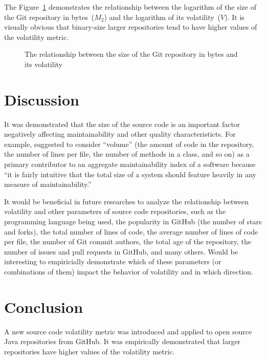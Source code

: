 \documentclass[sigconf]{acmart}
\begin{document}
The Figure~\ref{fig:2} demonstrates the relationship between
the logarithm of the size of the Git repository in bytes~($M_2$) and
the logarithm of its volatility~($V$).
It is visually obvious that
binary-size larger repositories tend to have higher values
of the volatility metric.

\begin{figure}[h]
  
  \caption{The relationship between the size of the Git repository in bytes and its volatility}
  \label{fig:2}
\end{figure}

\section{Discussion}
\label{sec:discussion}

It was demonstrated that the size of the source code is an important
factor negatively affecting maintainability and other quality characteristicts.
For example, \citet{heitlager2007} suggested to consider ``volume'' (the amount of code
in the repository, the number of lines per file, the number of methods in a class,
and so on) as a primary contributor to an aggregate maintainability index
of a software because ``it is fairly intuitive that the total size of a system should
feature heavily in any measure of maintainability.''

It would be beneficial in future researches to analyze the relationship between
volatility and other parameters of source code repositories,
such as
the programming language being used,
the popularity in GitHub (the number of stars and forks),
the total number of lines of code,
the average number of lines of code per file,
the number of Git commit authors,
the total age of the repository,
the number of issues and pull requests in GitHub,
and many others.
Would be interesting to empiricially demonstrate which of these parameters
(or combinations of them)
impact the behavior of volatility and in which direction.

\section{Conclusion}
\label{sec:conclusion}

A new source code volatility metric was introduced and applied
to \thetotalrepos{} open source Java repositories from GitHub. It was
empirically demonstrated that larger repositories have higher values
of the volatility metric.




\end{document}
